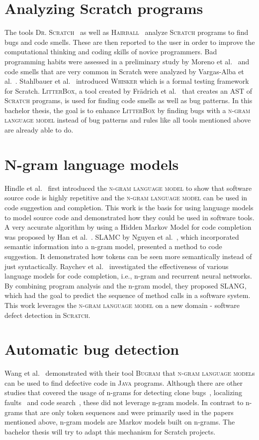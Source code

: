\documentclass[
    numbers=noenddot,
    parskip=half-,
    fontsize=12pt,
    paper=a4,
    oneside,
    titlepage,
    bibliography=totoc,
    chapterprefix=false,
]{scrbook}
\newcommand{\ngram}{\textsc{n-gram language model}}
\newcommand{\bugram}{\textsc{Bugram}}
\newcommand{\litterbox}{\textsc{LitterBox}}
\newcommand{\scratch}{\textsc{Scratch}}
\newcommand{\java}{\textsc{Java}}
\newcommand{\hairball}{\textsc{Hairball}}
\newcommand{\drscratch}{\textsc{Dr. Scratch}}
\newcommand{\whisker}{\textsc{Whisker}}
\begin{document}
    \section{Analyzing Scratch programs}\label{sec:analyzing-scratch}
    The tools \drscratch{}~\cite{drscratch} as well as \hairball{}~\cite{hairball} analyze \scratch{} programs to find bugs and code smells. These are then reported to the user in order to improve the computational thinking and coding skills of novice programmers. Bad programming habits were assessed in a preliminary study by Moreno et al.~\cite{badhabits} and code smells that are very common in Scratch were analyzed by Vargas-Alba et al.~\cite{badsmells}. Stahlbauer et al.~\cite{whisker} introduced \whisker{} which is a formal testing framework for Scratch. \litterbox, a tool created by Frädrich et al.~\cite{scratch_bugpatterns} that creates an AST of \scratch{} programs, is used for finding code smells as well as bug patterns. In this bachelor thesis, the goal is to enhance \litterbox{} by finding bugs with a \ngram{} instead of bug patterns and rules like all tools mentioned above are already able to do.
    

    \section{N-gram language models}\label{sec:language-models}
    Hindle et al.~\cite{naturalness} first introduced the \ngram{} to show that software source code is highly repetitive and the \ngram{} can be used in code suggestion and completion. This work is the basis for using language models to model source code and demonstrated how they could be used in software tools. A very accurate algorithm by using a Hidden Markov Model for code completion was proposed by Han et al.~\cite{codecompletion}. SLAMC by Nguyen et al.~\cite{SLAMC}, which incorporated semantic information into a n-gram model, presented a method to code suggestion. It demonstrated how tokens can be seen more semantically instead of just syntactically. Raychev et al.~\cite{SLANG} investigated the effectiveness of various language models for code completion, i.e., n-gram and recurrent neural networks. By combining program analysis and the n-gram model, they proposed SLANG, which had the goal to predict the sequence of method calls in a software system. This work leverages the \ngram{} on a new domain - software defect detection in \scratch{}.
    

    \section{Automatic bug detection}\label{sec:bugram}
    Wang et al.~\cite{bugram} demonstrated with their tool \bugram{} that \ngram{s} can be used to find defective code in \java{} programs. Although there are other studies that covered the usage of n-grams for detecting clone bugs~\cite{clonebugs}, localizing faults~\cite{faults} and code search~\cite{codesearch}, these did not leverage n-gram models. In contrast to n-grams that are only token sequences and were primarily used in the papers mentioned above, n-gram models are Markov models built on n-grams. The bachelor thesis will try to adapt this mechanism for Scratch projects.
\end{document}
